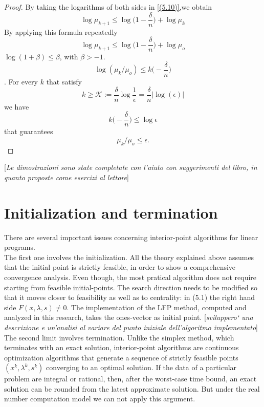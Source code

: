 \documentclass[a4paper,10 pt,titlepage,twoside]{book}
\theoremstyle{plain}
\theoremstyle{definition}
\theoremstyle{remark}
\begin{document}
\begin{proof}
	By taking the logarithms of both sides in \ref{(5.10)},we obtain
	\begin{equation*}
	\log\mu_{k+1}\leq \log \bigg(1-\frac{\delta}{n}\bigg)+\log\mu_{k}\end{equation*}
	By applying this formula repeatedly
	\begin{equation*}
	\log\mu_{k+1}\leq \log \bigg(1-\frac{\delta}{n}\bigg)+\log\mu_{o}
	\end{equation*}
	 $\log(1+\beta)\leq\beta$, with $\beta>-1$.\\
	\begin{equation*}
	\log(\mu_{k}/\mu_{o})\leq k\bigg(-\frac{\delta}{n}\bigg)
	\end{equation*}.	
For every $k$ that satisfy
\begin{equation*}
k\geq\mathcal{K}:= \frac{\delta}{n}\log\frac{1}{\epsilon} = \frac{\delta}{n}|\log(\epsilon)|
\end{equation*}
we have 
\begin{equation*}
k\bigg(-\frac{\delta}{n}\bigg)\leq\log\epsilon
\end{equation*}	
that guarantees
\begin{equation*}
\mu_{k}/\mu_{o}\leq\epsilon.
\end{equation*}	
\end{proof}

[\textit{Le dimostrazioni sono state completate con l'aiuto con suggerimenti del libro, in quanto proposte come esercizi al lettore}]
\section{Initialization and termination} 

There are several important issues concerning interior-point algorithms
for linear programs.\\The first one involves the initialization. All the theory explained above assumes that the initial point is strictly feasible, in order to show  a comprehensive convergence analysis. Even though, the most pratical algorithm does not require starting from  feasible initial-points. The search direction needs to be modified so that it moves closer to feasibility as well as to
centrality: in (5.1) the right hand side $F(x, \lambda, s)\neq0$. The implementation of the LFP method, computed and analyzed in this research, takes the ones-vector as initial point. [\textit{sviluppero` una descrizione e un'analisi al variare del punto iniziale dell'algoritmo implementato}]
\\
 The second limit involves termination. Unlike the simplex method,
which terminates with an exact solution, interior-point algorithms are continuous
optimization algorithms that generate a sequence of strictly feasible points $(x^{k}, \lambda^{k},s^{k})$ converging to
an optimal solution. If the data of a particular problem are integral or rational, then, after the worst-case time bound, an exact solution can be
rounded from the latest approximate solution. But under
the real number computation model we can not apply this argument.\\ 
\end{document}
